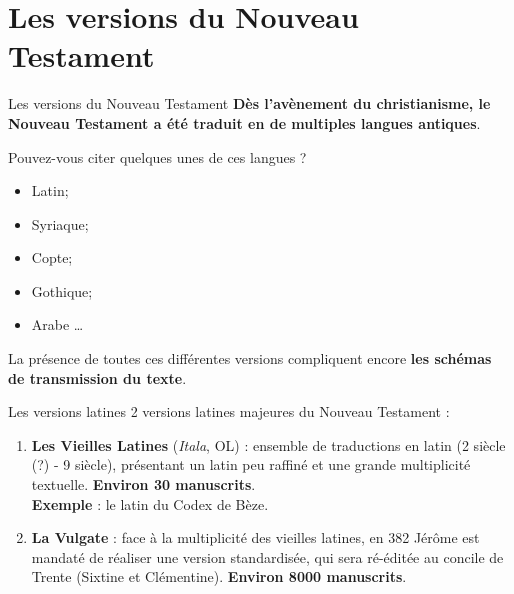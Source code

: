 \documentclass[11pt]{beamer}
\begin{document}
\section{Les versions du Nouveau Testament}

\begin{frame}{Les versions du Nouveau Testament}
    \textbf{Dès l'avènement du christianisme, le Nouveau Testament a été traduit en de multiples langues antiques}.

    \begin{block}{}
        Pouvez-vous citer quelques unes de ces langues ?
        \pause
        \begin{itemize}
            \item Latin;
            \item Syriaque;
            \item Copte;
            \item Gothique;
            \item Arabe \dots
        \end{itemize}
    \end{block}
    \pause
    
    \begin{alertblock}{}
La présence de toutes ces différentes versions compliquent encore \textbf{les schémas de transmission du texte}.
    \end{alertblock}
\end{frame}

\begin{frame}{Les versions latines}
    2 versions latines majeures du Nouveau Testament :

    \begin{enumerate}
        \item \textbf{Les Vieilles Latines} (\textit{Itala}, OL) : ensemble de traductions en latin (2 \ieme{} siècle (?) - 9\ieme{} siècle), présentant un latin peu raffiné et une grande multiplicité textuelle. \textbf{Environ 30 manuscrits}.\\
        \textbf{Exemple} : le latin du Codex de Bèze.\\
        \pause
        
        \item \textbf{La Vulgate} : face à la multiplicité des vieilles latines, en 382 Jérôme est mandaté de réaliser une version standardisée, qui sera ré-éditée au concile de Trente (Sixtine et Clémentine). \textbf{Environ 8000 manuscrits}.\\
    \end{enumerate}
\end{frame}
\end{document}
